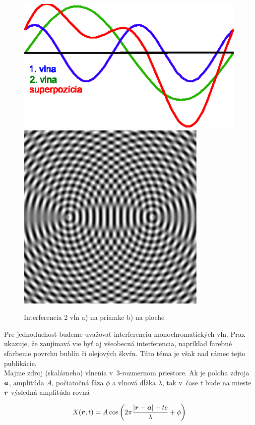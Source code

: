 \begin{figure}[htp]
 \centering
 \includegraphics{obrazky/optika/interferencia_1}
 \includegraphics{obrazky/optika/interferencia_2}

 \caption{Interferencia 2 vĺn a) na priamke b) na ploche}
 \label{fig:interferencia}
 \end{figure}

Pre jednoduchosť budeme uvažovať interferenciu monochromatických vĺn.
Prax ukazuje, že zaujímavá vie byť aj všeobecná interferencia,
napríklad farebné sfarbenie povrchu bublín či olejových škvŕn. 
Táto téma je však nad rámec tejto publikácie.
\\

Majme zdroj (skalárneho) vlnenia v~3-rozmernom priestore.
Ak je poloha zdroja $\boldsymbol{a}$, amplitúda $A$, počiatočná fáza $\phi$ a vlnová dĺžka
$\lambda$, tak v~čase $t$ bude na mieste $\boldsymbol{r}$ výsledná amplitúda rovná

\begin{equation}
X(\boldsymbol{r},t)=A \cos \left(2 \pi \frac{|\boldsymbol{r}-\boldsymbol{a}| - t
c}{\lambda}+\phi \right)
\end{equation}

